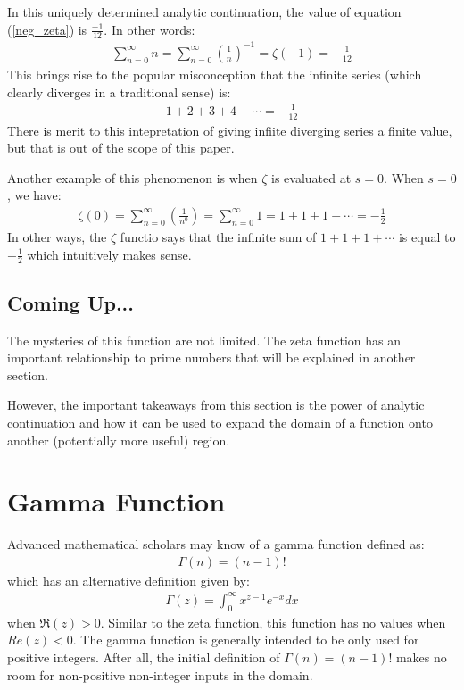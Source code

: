 \documentclass[14pt]{extarticle}
\begin{document}
In this uniquely determined analytic continuation, the value of equation (\ref{neg_zeta}) is $\frac{-1}{12}$. In other words:
\begin{align*}
    \sum_{n = 0}^{\infty} n = \sum_{n=0}^{\infty} \left(\frac{1}{n}\right)^{-1} = \zeta(-1) = \boxed{-\frac{1}{12}}
\end{align*}
This brings rise to the popular misconception that the infinite series (which clearly diverges in a traditional sense) is:
\begin{align*}
    1 + 2 + 3 + 4 + \cdots = -\frac{1}{12}
\end{align*}
There is merit to this intepretation of giving infiite diverging series a finite value, but that is out of the scope of this paper.

Another example of this phenomenon is when $\zeta$ is evaluated at $s = 0$. When $s = 0$, we have:
\begin{align*}
    \zeta(0) = \sum_{n = 0}^{\infty} \left(\frac{1}{n^0}\right) = \sum_{n = 0}^{\infty} 1 = 1 + 1 + 1 + \cdots = -\frac{1}{2}
\end{align*}
In other ways, the $\zeta$ functio says that the infinite sum of $1 + 1 + 1 + \cdots$ is equal to $-\frac{1}{2}$ which intuitively makes sense.

\subsection{Coming Up...}
The mysteries of this function are not limited. The zeta function has an important relationship to prime numbers that will be explained in
another section. 

However, the important takeaways from this section is the power of analytic continuation and how it can be used to 
expand the domain of a function onto another (potentially more useful) region.

\pagebreak

\section{Gamma Function}
\localtableofcontents

\vspace{1cm}
\noindent
Advanced mathematical scholars may know of a gamma function defined as:
\begin{align*}
    \Gamma (n) = (n - 1)!
\end{align*}
which has an alternative definition given by:
\begin{align*}
    \Gamma(z) = \int_0^\infty x^{z - 1} e^{-x} dx
\end{align*}
when $\Re(z) > 0$. Similar to the zeta function, this function has no values when $Re(z) < 0$. The gamma function is generally intended to
be only used for positive integers. After all, the initial definition of $\Gamma(n) = (n - 1)!$ makes no room for non-positive non-integer
inputs in the domain.
\end{document}
